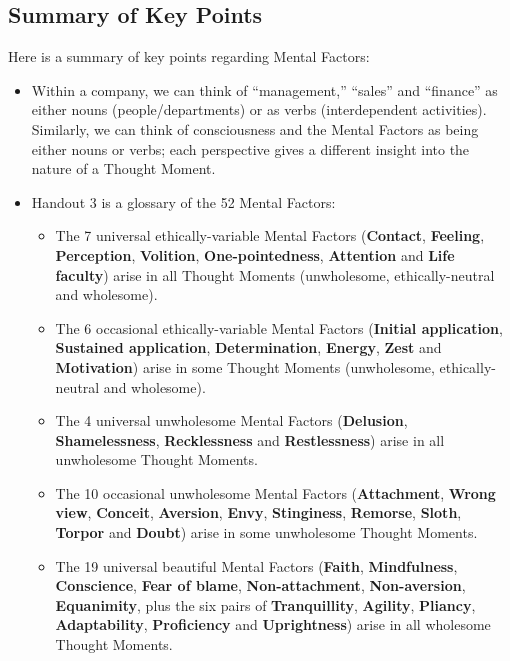 \subsection*{Summary of Key Points}

Here is a summary of key points regarding Mental Factors:

\begin{itemize}

\item Within a company, we can think of “management,” “sales” and “finance” as either nouns (people/departments) or as verbs (interdependent activities). Similarly, we can think of consciousness and the Mental Factors as being either nouns or verbs; each perspective gives a different insight into the nature of a Thought Moment.

\item Handout 3 is a glossary of the 52 Mental Factors:

\begin{itemize}

\item The 7 universal ethically-variable Mental Factors (\textbf{Contact}, \textbf{Feeling}, \textbf{Perception}, \textbf{Volition}, \textbf{One-pointedness}, \textbf{Attention} and \textbf{Life faculty}) arise in all Thought Moments (unwholesome, ethically-neutral and wholesome).

\item The 6 occasional ethically-variable Mental Factors (\textbf{Initial application}, \textbf{Sustained application}, \textbf{Determination}, \textbf{Energy}, \textbf{Zest} and \textbf{Motivation}) arise in some Thought Moments (unwholesome, ethically-neutral and wholesome).

\item The 4 universal unwholesome Mental Factors (\textbf{Delusion}, \textbf{Shamelessness}, \textbf{Recklessness} and \textbf{Restlessness}) arise in all unwholesome Thought Moments.

\item The 10 occasional unwholesome Mental Factors (\textbf{Attachment}, \textbf{Wrong view}, \textbf{Conceit}, \textbf{Aversion}, \textbf{Envy}, \textbf{Stinginess}, \textbf{Remorse}, \textbf{Sloth}, \textbf{Torpor} and \textbf{Doubt}) arise in some unwholesome Thought Moments.

\item The 19 universal beautiful Mental Factors (\textbf{Faith}, \textbf{Mindfulness}, \textbf{Conscience}, \textbf{Fear of blame}, \textbf{Non-attachment}, \textbf{Non-aversion}, \textbf{Equanimity}, plus the six pairs of \textbf{Tranquillity}, \textbf{Agility}, \textbf{Pliancy}, \textbf{Adaptability}, \textbf{Proficiency} and \textbf{Uprightness}) arise in all wholesome Thought Moments.


\end{itemize}
\end{itemize}
